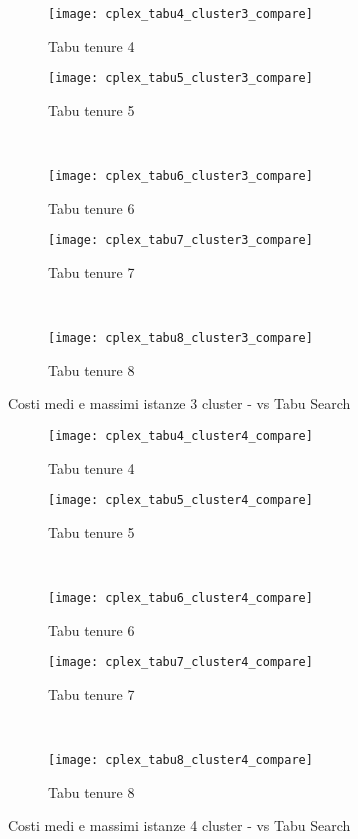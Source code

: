 \begin{figure}[H]
	\centering
	\begin{subfigure}[b]{.45\textwidth}
			\texttt{[image: cplex\_tabu4\_cluster3\_compare]}
			\caption{Tabu tenure 4}
	\end{subfigure}
	\quad
	\begin{subfigure}[b]{.45\textwidth}
			\texttt{[image: cplex\_tabu5\_cluster3\_compare]}
			\caption{Tabu tenure 5}
	\end{subfigure}
	\\
	\begin{subfigure}[b]{.45\textwidth}
			\texttt{[image: cplex\_tabu6\_cluster3\_compare]}
			\caption{Tabu tenure 6}
	\end{subfigure}
	\quad
	\begin{subfigure}[b]{.45\textwidth}
			\texttt{[image: cplex\_tabu7\_cluster3\_compare]}
			\caption{Tabu tenure 7}
	\end{subfigure}
	\\
	\begin{subfigure}[b]{.45\textwidth}
			\texttt{[image: cplex\_tabu8\_cluster3\_compare]}
			\caption{Tabu tenure 8}
	\end{subfigure}
	\caption{Costi medi e massimi istanze 3 cluster -  vs Tabu Search}
	\label{fig:costi cplex tabu cluster 3 completo}
\end{figure}

\begin{figure}[H]
	\centering
	\begin{subfigure}[b]{.45\textwidth}
			\texttt{[image: cplex\_tabu4\_cluster4\_compare]}
			\caption{Tabu tenure 4}
	\end{subfigure}
	\quad
	\begin{subfigure}[b]{.45\textwidth}
			\texttt{[image: cplex\_tabu5\_cluster4\_compare]}
			\caption{Tabu tenure 5}
	\end{subfigure}
	\\
	\begin{subfigure}[b]{.45\textwidth}
			\texttt{[image: cplex\_tabu6\_cluster4\_compare]}
			\caption{Tabu tenure 6}
	\end{subfigure}
	\quad
	\begin{subfigure}[b]{.45\textwidth}
			\texttt{[image: cplex\_tabu7\_cluster4\_compare]}
			\caption{Tabu tenure 7}
	\end{subfigure}
	\\
	\begin{subfigure}[b]{.45\textwidth}
			\texttt{[image: cplex\_tabu8\_cluster4\_compare]}
			\caption{Tabu tenure 8}
	\end{subfigure}
	\caption{Costi medi e massimi istanze 4 cluster -  vs Tabu Search}
	\label{fig:costi cplex tabu cluster 4 completo}
\end{figure}



